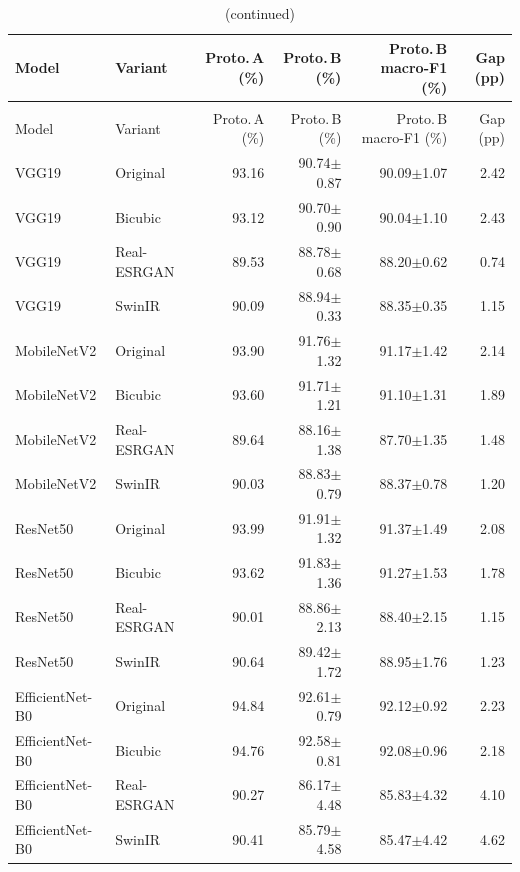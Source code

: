 \documentclass[11pt]{article}
\begin{document}
\small
\setlength{\tabcolsep}{4pt}
\begin{longtable}{@{}llrrrr@{}}
\caption{Protocol A vs.\ Protocol B accuracy, same-checkpoint, all model$\times$variant combinations.}\label{tab:s1}\\
\toprule
Model & Variant & Proto.\,A (\%) & Proto.\,B (\%) & Proto.\,B macro-F1 (\%) & Gap (pp) \\
\midrule
\endfirsthead
\caption[]{(continued)}\\
\toprule
Model & Variant & Proto.\,A (\%) & Proto.\,B (\%) & Proto.\,B macro-F1 (\%) & Gap (pp) \\
\midrule
\endhead
VGG19            & Original    & 93.16 & 90.74$\pm$0.87 & 90.09$\pm$1.07 & 2.42 \\
VGG19            & Bicubic     & 93.12 & 90.70$\pm$0.90 & 90.04$\pm$1.10 & 2.43 \\
VGG19            & Real-ESRGAN & 89.53 & 88.78$\pm$0.68 & 88.20$\pm$0.62 & 0.74 \\
VGG19            & SwinIR      & 90.09 & 88.94$\pm$0.33 & 88.35$\pm$0.35 & 1.15 \\
\addlinespace
MobileNetV2      & Original    & 93.90 & 91.76$\pm$1.32 & 91.17$\pm$1.42 & 2.14 \\
MobileNetV2      & Bicubic     & 93.60 & 91.71$\pm$1.21 & 91.10$\pm$1.31 & 1.89 \\
MobileNetV2      & Real-ESRGAN & 89.64 & 88.16$\pm$1.38 & 87.70$\pm$1.35 & 1.48 \\
MobileNetV2      & SwinIR      & 90.03 & 88.83$\pm$0.79 & 88.37$\pm$0.78 & 1.20 \\
\addlinespace
ResNet50         & Original    & 93.99 & 91.91$\pm$1.32 & 91.37$\pm$1.49 & 2.08 \\
ResNet50         & Bicubic     & 93.62 & 91.83$\pm$1.36 & 91.27$\pm$1.53 & 1.78 \\
ResNet50         & Real-ESRGAN & 90.01 & 88.86$\pm$2.13 & 88.40$\pm$2.15 & 1.15 \\
ResNet50         & SwinIR      & 90.64 & 89.42$\pm$1.72 & 88.95$\pm$1.76 & 1.23 \\
\addlinespace
EfficientNet-B0  & Original    & 94.84 & 92.61$\pm$0.79 & 92.12$\pm$0.92 & 2.23 \\
EfficientNet-B0  & Bicubic     & 94.76 & 92.58$\pm$0.81 & 92.08$\pm$0.96 & 2.18 \\
EfficientNet-B0  & Real-ESRGAN & 90.27 & 86.17$\pm$4.48 & 85.83$\pm$4.32 & 4.10 \\
EfficientNet-B0  & SwinIR      & 90.41 & 85.79$\pm$4.58 & 85.47$\pm$4.42 & 4.62 \\

\end{longtable}
\end{document}
